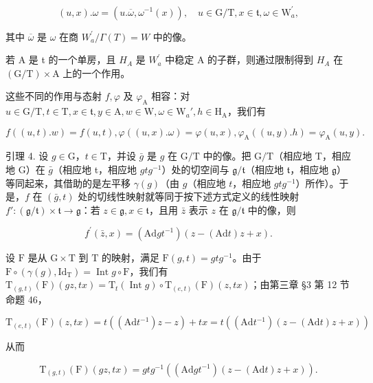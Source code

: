 \[
(u, x). \omega = (u. \overline {{\omega}}, \omega^ {- 1} (x)), \quad u \in \mathrm{G/T}, x \in \mathfrak {t}, \omega \in \mathrm{W} _ {a} ^ {\prime},
\]

其中 \(\overline{\omega}\) 是 \(\omega\) 在商 \(W_{a}^{\prime}/\Gamma(T)=W\) 中的像。

若 A 是 t 的一个单房，且 \(H_{A}\) 是 \(W_{a}^{\prime}\) 中稳定 A 的子群，则通过限制得到 \(H_{A}\) 在 \((\mathrm{G}/\mathrm{T}) \times \mathrm{A}\) 上的一个作用。

这些不同的作用与态射 \(f, \varphi\) 及 \(\varphi_{\mathrm{A}}\) 相容：对 \(u \in \mathrm{G} / \mathrm{T}, t \in \mathrm{T}, x \in \mathfrak{t}, y \in \mathrm{A}, w \in \mathrm{W}, \omega \in \mathrm{W}_a', h \in \mathrm{H}_{\mathrm{A}}\)，我们有

\[
f ((u, t). w) = f (u, t), \varphi ((u, x). \omega) = \varphi (u, x), \varphi_ {\mathrm{A}} ((u, y). h) = \varphi_ {\mathrm{A}} (u, y).
\]

引理 4. 设 \(g \in \mathrm{G}\)，\(t \in \mathrm{T}\)，并设 \(\bar{g}\) 是 \(g\) 在 \(\mathrm{G} / \mathrm{T}\) 中的像。把 \(\mathrm{G} / \mathrm{T}\)（相应地 T，相应地 G）在 \(\bar{g}\)（相应地 t，相应地 \(gtg^{-1}\)）处的切空间与 \(\mathfrak{g} / \mathfrak{t}\)（相应地 \(\mathfrak{t}\)，相应地 \(\mathfrak{g}\)）等同起来，其借助的是左平移 \(\gamma(g)\)（由 \(g\)（相应地 \(t\)，相应地 \(gtg^{-1}\)）所作）。于是，\(f\) 在 \((\bar{g}, t)\) 处的切线性映射就等同于按下述方式定义的线性映射 \(f': (\mathfrak{g} / \mathfrak{t}) \times \mathfrak{t} \to \mathfrak{g}\)：若 \(z \in \mathfrak{g}, x \in \mathfrak{t}\)，且用 \(\bar{z}\) 表示 \(z\) 在 \(\mathfrak{g} / \mathfrak{t}\) 中的像，则

\[
f ^ {\prime} (\bar {z}, x) = (\mathrm{Ad} g t ^ {- 1}) (z - (\mathrm{Ad} t) z + x).
\]

设 \(\mathrm{F}\) 是从 \(\mathrm{G} \times \mathrm{T}\) 到 \(\mathrm{T}\) 的映射，满足 \(\mathrm{F}(g,t) = gtg^{-1}\)。由于 \(\mathrm{F} \circ (\gamma(g), \mathrm{Id}_{\mathrm{T}}) = \operatorname{Int} g \circ \mathrm{F}\)，我们有 \(\mathrm{T}_{(g,t)}(\mathrm{F})(gz, tx) = \mathrm{T}_t(\operatorname{Int} g) \circ \mathrm{T}_{(e,t)}(\mathrm{F})(z, tx)\)；由第三章 §3 第 12 节命题 46，

\[
\mathrm{T} _ {(e, t)} (\mathrm{F}) (z, t x) = t ((\mathrm{Ad} t ^ {- 1}) z - z) + t x = t ((\mathrm{Ad} t ^ {- 1}) (z - (\mathrm{Ad} t) z + x))
\]

从而

\[
\mathrm{T} _ {(g, t)} (\mathrm{F}) (g z, t x) = g t g ^ {- 1} ((\mathrm{Ad}   g t ^ {- 1}) (z - (\mathrm{Ad}   t) z + x)).
\]

